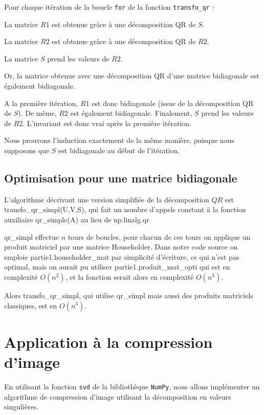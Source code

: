 \documentclass{article}
\begin{document}
Pour chaque itération de la boucle \verb|for| de la fonction \verb|transfo_qr| :
\smallskip

\noindent La matrice $R1$ est obtenue grâce à une décomposition QR de $S$.

\noindent La matrice $R2$ est obtenue grâce à une décomposition QR de $R2$.

\noindent La matrice $S$ prend les valeurs de $R2$.

\smallskip
Or, la matrice obtenue avec une décomposition QR d'une matrice bidiagonale est également bidiagonale. %

A la première itération, $R1$ est donc bidiagonale (issue de la décomposition QR de $S$). De même, $R2$ est également bidiagonale. Finalement, $S$ prend les valeurs de $R2$. L'invariant est donc vrai après la première itération.

\smallskip

Nous prouvons l'induction exactement de la même manière, puisque nous supposons que $S$ est bidiagonale au début de l'itération.

\subsection{Optimisation pour une matrice bidiagonale}
\label{ssec:opti_bidiag_qr}

L'algorithme décrivant une version simplifiée de la décomposition $QR$ est transfo\_qr\_simpl(U,V,S), qui fait un nombre d'appels constant à la fonction auxiliaire qr\_simple(A) au lieu de np.linalg.qr

qr\_simpl effectue $n$ tours de boucles, pour chacun de ces tours on applique un produit matriciel par une matrice Householder. Dans notre code source on emploie partie1.householder\_mat par simplicité d'écriture, ce qui n'est pas optimal,
mais on aurait pu utiliser partie1.produit\_mat\_opti qui est en complexité $O(n^2)$, et la fonction serait alors en complexité $O(n^3)$.

Alors transfo\_qr\_simpl, qui utilise qr\_simpl mais aussi des produits matriciels classiques, est en $O(n^3)$.


\section{Application à la compression d'image}
\label{sec:appli_compr_img}

En utilisant la fonction \verb|svd| de la bibliothèque \verb|NumPy|, nous allons implémenter un algorithme de compression d'image utilisant
la décomposition en valeurs singulières.
\end{document}
